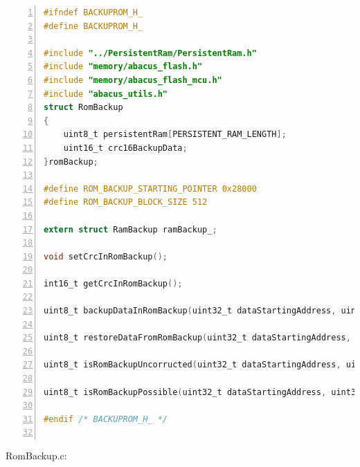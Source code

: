 \documentclass[LaM,binding=0.6cm,oneside]{../sapthesis}
\begin{document}
\begin{lstlisting}[language=C,
                   basicstyle=\scriptsize,
                   numbers=left,
                   stepnumber=0,
                   numbersep=4pt,
                   tabsize=2,
                   showspaces=false,
                   showstringspaces=false]
#ifndef BACKUPROM_H_
#define BACKUPROM_H_

#include "../PersistentRam/PersistentRam.h"
#include "memory/abacus_flash.h"
#include "memory/abacus_flash_mcu.h"
#include "abacus_utils.h"
struct RomBackup
{
    uint8_t persistentRam[PERSISTENT_RAM_LENGTH];
    uint16_t crc16BackupData;
}romBackup;

#define ROM_BACKUP_STARTING_POINTER 0x28000
#define ROM_BACKUP_BLOCK_SIZE 512

extern struct RamBackup ramBackup_;

void setCrcInRomBackup();

int16_t getCrcInRomBackup();

uint8_t backupDataInRomBackup(uint32_t dataStartingAddress, uint32_t backupStartingPointer, uint32_t size);

uint8_t restoreDataFromRomBackup(uint32_t dataStartingAddress, uint32_t backupStartingPointer, uint32_t size);

uint8_t isRomBackupUncorructed(uint32_t dataStartingAddress, uint32_t size);

uint8_t isRomBackupPossible(uint32_t dataStartingAddress, uint32_t size);

#endif /* BACKUPROM_H_ */


\end{lstlisting}
RomBackup.c:
\end{document}
